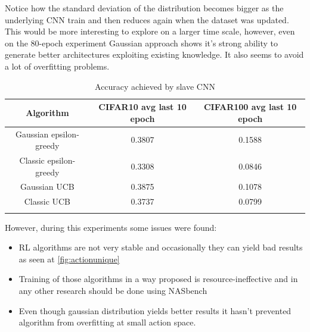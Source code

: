 Notice how the standard deviation of the distribution becomes bigger as the underlying CNN train and then reduces again when the dataset was updated. This would be more interesting to explore on a larger time scale, however, even on the 80-epoch experiment Gaussian approach shows it's strong ability to generate better architectures exploiting existing knowledge. It also seems to avoid a lot of overfitting problems.

\begin{table}[h!]
\centering
\begin{tabular}{c c c} 
 \hline
 Algorithm & CIFAR10 avg last 10 epoch & CIFAR100 avg last 10 epoch \\ [0.5ex] 
 \hline
 Gaussian epsilon-greedy & 0.3807 & 0.1588\\
 \hline
 Classic epsilon-greedy & 0.3308 & 0.0846 \\
 \hline
 Gaussian UCB & 0.3875 & 0.1078\\
 \hline
 Classic UCB & 0.3737 & 0.0799\\
 \hline \\ [0.5ex]
\end{tabular}
\caption{Accuracy achieved by slave CNN}
\label{table:5}
\end{table}

However, during this experiments some issues were found:

\begin{itemize}
\item{RL algorithms are not very stable and occasionally they can yield bad results as seen at \ref{fig:actionunique}}
\item{Training of those algorithms in a way proposed is resource-ineffective and in any other research should be done using NASbench \cite[see]{pmlr-v97-ying19a}}
\item{Even though gaussian distribution yields better results it hasn't prevented algorithm from overfitting at small action space}.
\end{itemize}
